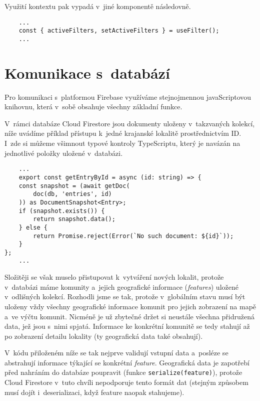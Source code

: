 Využití kontextu pak vypadá v~jiné komponentě následovně.

\begin{verbatim}
    ...
    const { activeFilters, setActiveFilters } = useFilter(); 
    ...
    \end{verbatim}

\hypertarget{komunikace-s-databuxe1zuxed}{%
\section{Komunikace s~databází}\label{komunikace-s-databuxe1zuxed}}

Pro komunikaci s~platformou Firebase využíváme stejnojmennou javaScriptovou knihovnu, která v~sobě obsahuje všechny základní funkce.

V~rámci databáze Cloud Firestore jsou dokumenty uloženy v~takzvaných kolekcí, níže uvádíme příklad přístupu k~jedné krajanské lokalitě prostřednictvím ID. I~zde si můžeme všimnout typové kontroly TypeScriptu, který je navázán na jednotlivé položky uložené v~databázi.

\begin{verbatim}
    ...
    export const getEntryById = async (id: string) => {
    const snapshot = (await getDoc(
        doc(db, 'entries', id)
    )) as DocumentSnapshot<Entry>;
    if (snapshot.exists()) {
        return snapshot.data();
    } else {
        return Promise.reject(Error(`No such document: ${id}`));
    }
};
    ...
    \end{verbatim}

Složitěji se však muselo přistupovat k~vytváření nových lokalit, protože v~databázi máme komunity a~jejich geografické informace (\emph{features}) uložené v~odlišných kolekcí. Rozhodli jsme se tak, protože v~globálním stavu musí být uloženy vždy všechny geografické informace komunit pro jejich zobrazení na mapě a~ve výčtu komunit. Nicméně je už zbytečné držet si neustále všechna přidružená data, jež jsou s~nimi spjatá. Informace ke konkrétní komunitě se tedy stahují až po zobrazení detailu lokality (ty geografická data také obsahují).

V~kódu přiloženém níže se tak nejprve validují vstupní data a~posléze se abstrahují informace týkající se konkrétní \emph{feature}. Geografická data je zapotřebí před nahráním do databáze poupravit (funkce \verb|serialize(feature)|), protože Cloud Firestore v~tuto chvíli nepodporuje tento formát dat (stejným způsobem musí dojít i~deserializaci, když feature naopak stahujeme).

